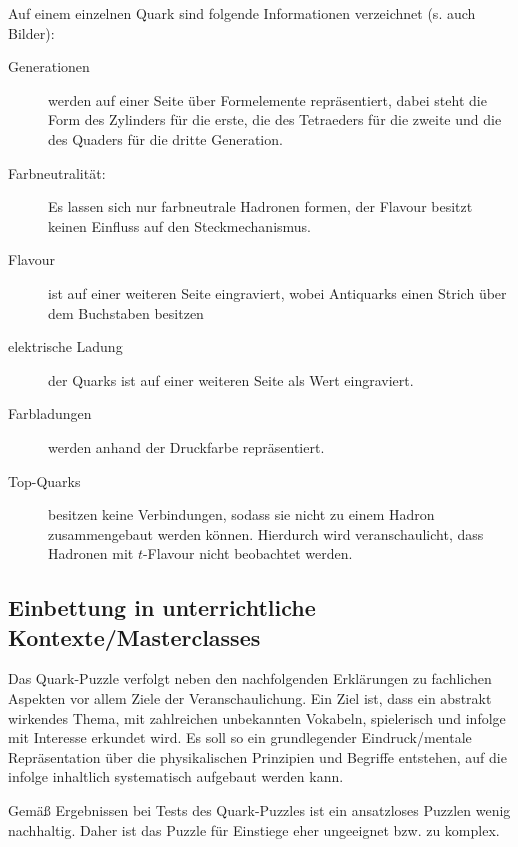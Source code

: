 Auf einem einzelnen Quark sind folgende Informationen verzeichnet (s. auch Bilder):

  \begin{description}
    \item[Generationen]werden auf einer Seite über Formelemente repräsentiert, dabei steht die Form des Zylinders für die erste, die des Tetraeders für die zweite und die des Quaders für die dritte Generation.
    \item[Farbneutralität:]Es lassen sich nur farbneutrale Hadronen formen, der Flavour besitzt keinen Einfluss auf den Steckmechanismus.
    \item[ Flavour]ist auf einer weiteren Seite eingraviert, wobei Antiquarks einen Strich über dem Buchstaben besitzen
    \item[ elektrische Ladung]der Quarks ist auf einer weiteren Seite als Wert eingraviert.
    \item[Farbladungen]werden anhand der Druckfarbe repräsentiert.
    \item[Top-Quarks]besitzen keine Verbindungen, sodass sie nicht zu einem Hadron zusammengebaut werden können. Hierdurch wird veranschaulicht, dass Hadronen mit $t$-Flavour nicht beobachtet werden.
\end{description}

\subsection*{Einbettung in unterrichtliche Kontexte/Masterclasses}

Das Quark-Puzzle verfolgt neben den nachfolgenden Erklärungen zu fachlichen Aspekten vor allem Ziele der Veranschaulichung. Ein Ziel ist, dass ein abstrakt wirkendes Thema, mit zahlreichen unbekannten Vokabeln, spielerisch und infolge mit Interesse erkundet wird. Es soll so ein grundlegender Eindruck/mentale Repräsentation über die physikalischen Prinzipien und Begriffe entstehen, auf die infolge inhaltlich systematisch aufgebaut werden kann. 

Gemäß Ergebnissen bei Tests des Quark-Puzzles ist ein \glqq ansatzloses\grqq{} Puzzlen wenig nachhaltig. Daher ist das Puzzle für Einstiege eher ungeeignet bzw. zu komplex.  

